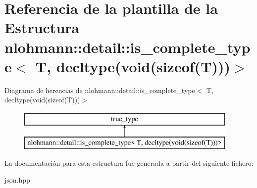 \hypertarget{structnlohmann_1_1detail_1_1is__complete__type_3_01T_00_01decltype_07void_07sizeof_07T_08_08_08_4}{}\section{Referencia de la plantilla de la Estructura nlohmann\+:\+:detail\+:\+:is\+\_\+complete\+\_\+type$<$ T, decltype(void(sizeof(T)))$>$}
\label{structnlohmann_1_1detail_1_1is__complete__type_3_01T_00_01decltype_07void_07sizeof_07T_08_08_08_4}
Diagrama de herencias de nlohmann\+:\+:detail\+:\+:is\+\_\+complete\+\_\+type$<$ T, decltype(void(sizeof(T)))$>$\begin{figure}[H]
\begin{center}
\leavevmode
\includegraphics[height=2.000000cm]{structnlohmann_1_1detail_1_1is__complete__type_3_01T_00_01decltype_07void_07sizeof_07T_08_08_08_4}
\end{center}
\end{figure}


La documentación para esta estructura fue generada a partir del siguiente fichero\+:\begin{DoxyCompactItemize}
\item 
json.\+hpp\end{DoxyCompactItemize}
